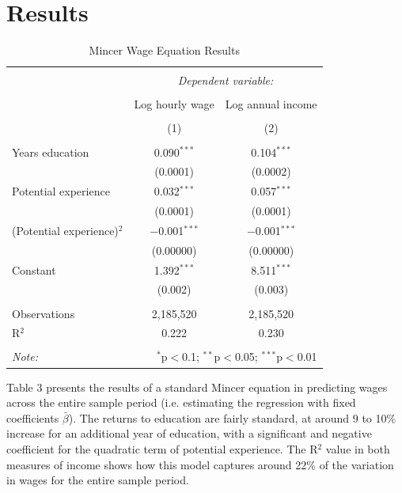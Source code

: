 \documentclass[notitlepage,12pt]{article}
\begin{document}
\section{Results}

\begin{table}[h!]
\centering
\caption{Mincer Wage Equation Results}
\begin{tabular}{@{\extracolsep{5pt}}lcc} 
\\[-1.8ex]\hline 
\hline \\[-1.8ex] 
 & \multicolumn{2}{c}{\textit{Dependent variable:}} \\ 
\cline{2-3} 
\\[-1.8ex] & Log hourly wage & Log annual income \\ 
\\[-1.8ex] & (1) & (2)\\ 
\hline \\[-1.8ex] 
 Years education & 0.090$^{***}$ & 0.104$^{***}$ \\ 
  & (0.0001) & (0.0002) \\ 
  Potential experience & 0.032$^{***}$ & 0.057$^{***}$ \\ 
  & (0.0001) & (0.0001) \\ 
  (Potential experience)$^2$ & $-$0.001$^{***}$ & $-$0.001$^{***}$ \\ 
  & (0.00000) & (0.00000) \\ 
  Constant & 1.392$^{***}$ & 8.511$^{***}$ \\ 
  & (0.002) & (0.003) \\ 
 \hline \\[-1.8ex] 
Observations & 2,185,520 & 2,185,520 \\ 
R$^{2}$ & 0.222 & 0.230 \\
\hline 
\hline \\[-1.8ex] 
\textit{Note:}  & \multicolumn{2}{r}{$^{*}$p$<$0.1; $^{**}$p$<$0.05; $^{***}$p$<$0.01} \\ 
\end{tabular} 
\end{table}
Table 3 presents the results of a standard Mincer equation in predicting wages across the entire sample period (i.e. estimating the regression with fixed coefficients $\bar{\beta}$).  The returns to education are fairly standard, at around 9 to 10\% increase for an additional year of education, with a significant and negative coefficient for the quadratic term of potential experience.  The R$^2$ value in both measures of income shows how this model captures around 22\% of the variation in wages for the entire sample period.
\end{document}
